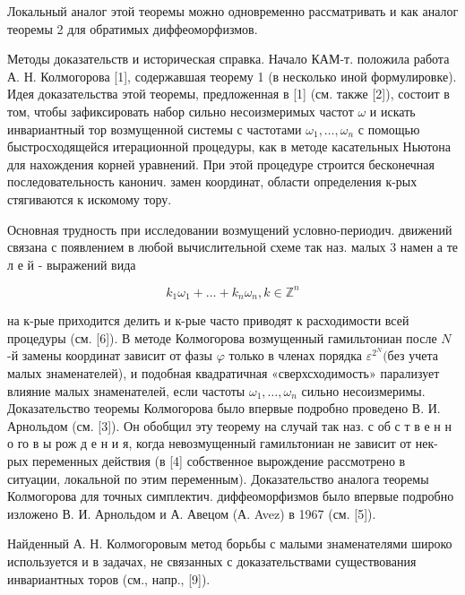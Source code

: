 \documentclass[10pt]{article}
\begin{document}
Локальный аналог этой теоремы можно одновременно рассматривать и как аналог теоремы 2 для обратимых диффеоморфизмов.



Методы доказательств и историческая справка. Начало КАМ-т. положила работа А. Н. Колмогорова [1], содержавшая теорему 1 (в несколько иной формулировке). Идея доказательства этой теоремы, предложенная в [1] (см. также [2]), состоит в том, чтобы зафиксировать набор сильно несоизмеримых частот $\omega$ и искать инвариантный тор возмущенной системы с частотами $\omega_{1}, \ldots, \omega_{n}$ с помощью быстросходящейся итерационной процедуры, как в методе касательных Ньютона для нахождения корней уравнений. При этой процедуре строится бесконечная последовательность канонич. замен координат, области определения к-рых стягиваются к искомому тору.



Основная трудность при исследовании возмущений условно-периодич. движений связана с появлением в любой вычислительной схеме так наз. малых 3 намен а те л е й - выражений вида



\[

k_{1} \omega_{1}+\ldots+k_{n} \omega_{n}, k \in \mathbb{Z}^{n}

\]



на к-рые приходится делить и к-рые часто приводят к расходимости всей процедуры (см. [6]). В методе Колмогорова возмущенный гамильтониан после $N$-й замены координат зависит от фазы $\varphi$ только в членах порядка $\varepsilon^{2^{N}}(б е з$ учета малых знаменателей), и подобная квадратичная «сверхсходимость» парализует влияние малых знаменателей, если частоты $\omega_{1}, \ldots, \omega_{n}$ сильно несоизмеримы. Доказательство теоремы Колмогорова было впервые подробно проведено В. И. Арнольдом (см. [3]). Он обобщил эту теорему на случай так наз. с об с т в е н н о го в ы рож д е н и я, когда невозмущенный гамильтониан не зависит от нек-рых переменных действия (в [4] собственное вырождение рассмотрено в ситуации, локальной по этим переменным). Доказательство аналога теоремы Колмогорова для точных симплектич. диффеоморфизмов было впервые подробно изложено В. И. Арнольдом и А. Авецом (А. Avez) в 1967 (см. [5]).



Найденный А. Н. Колмогоровым метод борьбы с малыми знаменателями широко используется и в задачах, не связанных с доказательствами существования инвариантных торов (см., напр., [9]).
\end{document}
